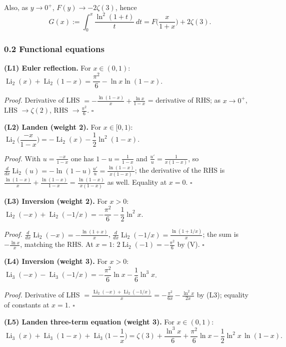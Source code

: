 \documentclass[11pt]{article}
\theoremstyle{remark}
\begin{document}
Also, as $y\to0^+$, $F(y)\to-2\zeta(3)$, hence
\begin{equation*}
G(x):=\int_0^x\frac{\ln^2(1+t)}{t}\,dt=F\!\Big(\frac{x}{1+x}\Big)+2\zeta(3). \tag{A6$'$}
\end{equation*}

\subsubsection*{0.2 Functional equations}

\textbf{(L1) Euler reflection.} For $x\in(0,1)$: $\operatorname{Li}_2(x)+\operatorname{Li}_2(1-x)=\dfrac{\pi^2}{6}-\ln x\ln(1-x)$.

\textit{Proof.} Derivative of LHS $=-\frac{\ln(1-x)}{x}+\frac{\ln x}{1-x}$ = derivative of RHS; as $x\to0^+$, LHS $\to\zeta(2)$, RHS $\to\frac{\pi^2}6$. $\square$

\textbf{(L2) Landen (weight 2).} For $x\in[0,1)$: $\operatorname{Li}_2\!\Big(\dfrac{-x}{1-x}\Big)=-\operatorname{Li}_2(x)-\dfrac12\ln^2(1-x)$.

\textit{Proof.} With $u=\frac{-x}{1-x}$ one has $1-u=\frac1{1-x}$ and $\frac{u'}{u}=\frac{1}{x(1-x)}$, so $\frac{d}{dx}\operatorname{Li}_2(u)=-\ln(1-u)\frac{u'}{u}=\frac{\ln(1-x)}{x(1-x)}$; the derivative of the RHS is $\frac{\ln(1-x)}{x}+\frac{\ln(1-x)}{1-x}=\frac{\ln(1-x)}{x(1-x)}$ as well. Equality at $x=0$. $\square$

\textbf{(L3) Inversion (weight 2).} For $x>0$: $\operatorname{Li}_2(-x)+\operatorname{Li}_2(-1/x)=-\dfrac{\pi^2}{6}-\dfrac12\ln^2x$.

\textit{Proof.} $\frac{d}{dx}\operatorname{Li}_2(-x)=-\frac{\ln(1+x)}{x}$, $\frac{d}{dx}\operatorname{Li}_2(-1/x)=\frac{\ln(1+1/x)}{x}$; the sum is $-\frac{\ln x}{x}$, matching the RHS. At $x=1$: $2\operatorname{Li}_2(-1)=-\frac{\pi^2}6$ by (V). $\square$

\textbf{(L4) Inversion (weight 3).} For $x>0$: $\operatorname{Li}_3(-x)-\operatorname{Li}_3(-1/x)=-\dfrac{\pi^2}{6}\ln x-\dfrac16\ln^3x$.

\textit{Proof.} Derivative of LHS $=\frac{\operatorname{Li}_2(-x)+\operatorname{Li}_2(-1/x)}{x}=-\frac{\pi^2}{6x}-\frac{\ln^2x}{2x}$ by (L3); equality of constants at $x=1$. $\square$

\textbf{(L5) Landen three-term equation (weight 3).} For $x\in(0,1)$:
\[
\operatorname{Li}_3(x)+\operatorname{Li}_3(1-x)+\operatorname{Li}_3\!\Big(1-\frac1x\Big)=\zeta(3)+\frac{\ln^3x}{6}+\frac{\pi^2}{6}\ln x-\frac12\ln^2x\,\ln(1-x).
\]
\end{document}
